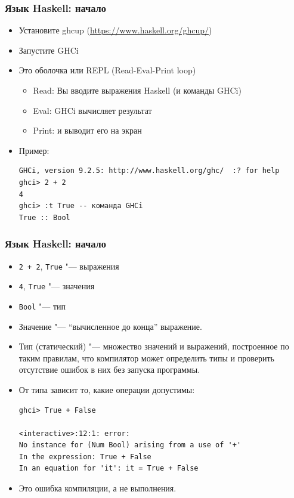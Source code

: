 \documentclass[10pt]{beamer}
\begin{document}
\begin{frame}[fragile]
  \frametitle{Язык Haskell: начало}
  \begin{itemize}
    \item Установите ghcup (\url{https://www.haskell.org/ghcup/})
    \item Запустите GHCi
    \item Это оболочка или REPL (Read-Eval-Print loop)
          \begin{itemize}
            \item Read: Вы вводите выражения Haskell (и команды GHCi)
            \item Eval: GHCi вычисляет результат
            \item Print: и выводит его на экран
          \end{itemize}
    \item Пример:
          \begin{lstlisting}[breaklines]
GHCi, version 9.2.5: http://www.haskell.org/ghc/  :? for help
ghci> 2 + 2
4
ghci> :t True -- команда GHCi
True :: Bool
\end{lstlisting}
  \end{itemize}
\end{frame}

\begin{frame}[fragile]
  \frametitle{Язык Haskell: начало}
  \begin{itemize}
    \item \lstinline|2 + 2|, \lstinline|True| "--- выражения
    \item \lstinline|4|, \lstinline|True| "--- значения
    \item \lstinline|Bool| "--- тип
          \pause
    \item Значение "--- \enquote{вычисленное до конца} выражение.
    \item Тип (статический) "--- множество значений и выражений, построенное по таким правилам, что компилятор может определить типы и проверить отсутствие ошибок в них без запуска программы.
    \item От типа зависит то, какие операции допустимы:
          \begin{lstlisting}[basicstyle=\ttfamily\small]
ghci> True + False

<interactive>:12:1: error:
No instance for (Num Bool) arising from a use of '+'
In the expression: True + False
In an equation for 'it': it = True + False
\end{lstlisting}
    \item Это ошибка компиляции, а не выполнения.
  \end{itemize}
\end{frame}
\end{document}

